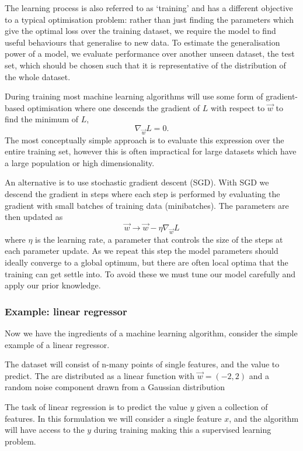The learning process is also referred to as `training' and has a different objective to a typical optimisation problem: rather than just finding the parameters which give the optimal loss over the training dataset, we require the model to find useful behaviours that generalise to new data. 
To estimate the generalisation power of a model, we evaluate performance over another unseen dataset, the test set, which should be chosen such that it is representative of the distribution of the whole dataset.


During training most machine learning algorithms will use some form of gradient-based optimisation where one descends the gradient of $L$ with respect to $\vec{w}$ to find the minimum of $L$,
\begin{equation}
    \nabla_{\vec{w}}L = 0.
\end{equation}
The most conceptually simple approach is to evaluate this expression over the entire training set, however this is often impractical for large datasets which have a large population or high dimensionality. 

An alternative is to use stochastic gradient descent (SGD). With SGD we descend the gradient in steps where each step is performed by evaluating the gradient with small batches of training data (minibatches). 
The parameters are then updated as
\begin{equation}
    \vec{w} \rightarrow \vec{w} - \eta\nabla_{\vec{w}}L
\end{equation}
where $\eta$ is the learning rate, a parameter that controls the size of the steps at each parameter update. As we repeat this step the model parameters should ideally converge to a global optimum, but there are often local optima that the training can get settle into. To avoid these we must tune our model carefully and apply our prior knowledge. 


\subsubsection{Example: linear regressor}
Now we have the ingredients of a machine learning algorithm, consider the simple example of a linear regressor. 

The dataset will consist of n-many points of single features, and the value to predict. The are distributed as a linear function with $\vec{w} = (-2,2)$ and a random noise component drawn from a Gaussian distribution

The task of linear regression is to predict the value $y$ given a collection of features. In this formulation we will consider a single feature $x$, and the algorithm will have access to the $y$ during training making this a supervised learning problem. 

